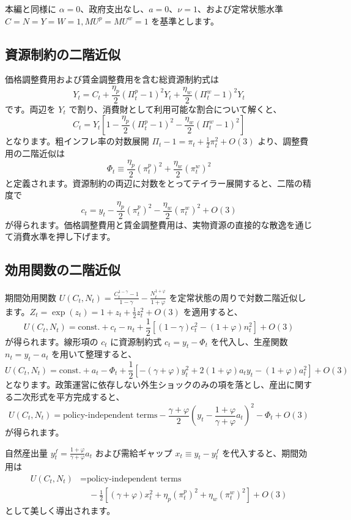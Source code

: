 \documentclass[
  japanese,
  lualatex,
  ja=standard,
  12pt,
  a4paper]{ltjsarticle}
\begin{document}
本編と同様に
\(\alpha=0\)、政府支出なし、\(a=0\)、\(\nu=1\)、および定常状態水準
\(C=N=Y=W=1, MU^p=MU^w=1\) を基準とします。

\subsection{資源制約の二階近似}\label{ux8cc7ux6e90ux5236ux7d04ux306eux4e8cux968eux8fd1ux4f3c}

価格調整費用および賃金調整費用を含む総資源制約式は \[
Y_t
=
C_t
+
\frac{\eta_p}{2}(\Pi_t^p-1)^2Y_t
+
\frac{\eta_w}{2}(\Pi_t^w-1)^2Y_t
\] です。両辺を \(Y_t\)
で割り、消費財として利用可能な割合について解くと、 \[
C_t
=
Y_t
\left[
1
-
\frac{\eta_p}{2}(\Pi_t^p-1)^2
-
\frac{\eta_w}{2}(\Pi_t^w-1)^2
\right]
\] となります。粗インフレ率の対数展開
\(\Pi_t-1 = \pi_t + \frac{1}{2}\pi_t^2 + O(3)\)
より、調整費用の二階近似は \[
\Phi_t
\equiv
\frac{\eta_p}{2}(\pi_t^p)^2
+
\frac{\eta_w}{2}(\pi_t^w)^2
\]
と定義されます。資源制約の両辺に対数をとってテイラー展開すると、二階の精度で
\[
c_t
=
y_t
-
\frac{\eta_p}{2}(\pi_t^p)^2
-
\frac{\eta_w}{2}(\pi_t^w)^2
+O(3)
\]
が得られます。価格調整費用と賃金調整費用は、実物資源の直接的な散逸を通じて消費水準を押し下げます。

\Needspace{0.28\textheight}

\subsection{効用関数の二階近似}\label{ux52b9ux7528ux95a2ux6570ux306eux4e8cux968eux8fd1ux4f3c}

期間効用関数
\(U(C_t, N_t) = \frac{C_t^{1-\gamma}-1}{1-\gamma} - \frac{N_t^{1+\varphi}}{1+\varphi}\)
を定常状態の周りで対数二階近似します。\(Z_t = \exp(z_t) = 1 + z_t + \frac{1}{2}z_t^2 + O(3)\)
を適用すると、 \[
U(C_t,N_t)
=
\text{const.}
+
c_t-n_t
+
\frac{1}{2}
\left[
(1-\gamma)c_t^2
-
(1+\varphi)n_t^2
\right]
+O(3)
\] が得られます。線形項の \(c_t\) に資源制約式 \(c_t = y_t - \Phi_t\)
を代入し、生産関数 \(n_t = y_t - a_t\) を用いて整理すると、 \[
U(C_t,N_t)
=
\text{const.}
+a_t
-\Phi_t
+
\frac{1}{2}
\left[
-(\gamma+\varphi)y_t^2
+2(1+\varphi)a_t y_t
-(1+\varphi)a_t^2
\right]
+O(3)
\]
となります。政策運営に依存しない外生ショックのみの項を落とし、産出に関する二次形式を平方完成すると、
\[
U(C_t,N_t)
=
\text{policy-independent terms}
-
\frac{\gamma+\varphi}{2}
\left(
y_t-\frac{1+\varphi}{\gamma+\varphi}a_t
\right)^2
-
\Phi_t
+O(3)
\] が得られます。

自然産出量 \(y_t^f = \frac{1+\varphi}{\gamma+\varphi}a_t\)
および需給ギャップ \(x_t \equiv y_t - y_t^f\) を代入すると、期間効用は
\[
\begin{aligned}
U(C_t,N_t)
&=
\text{policy-independent terms}
\\
&\quad-
\frac{1}{2}
\left[
(\gamma+\varphi)x_t^2
+
\eta_p(\pi_t^p)^2
+
\eta_w(\pi_t^w)^2
\right]
+O(3)
\end{aligned}
\] として美しく導出されます。
\end{document}
